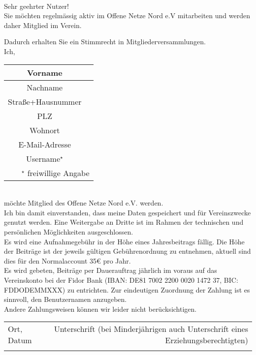 \documentclass[a4paper,8pt]{article}
\begin{document}
\ \\

Sehr geehrter Nutzer!\\

Sie möchten regelmässig aktiv im Offene Netze Nord e.V mitarbeiten und werden daher Mitglied im Verein.

Dadurch erhalten Sie ein Stimmrecht in Mitgliederversammlungen.\\

Ich,\\
\begin{tabular}{||c|p{10cm}||}
\hline
\hline
Vorname &\\
\hline
Nachname &\\
\hline
Straße+Hausnummer &\\
\hline
PLZ &\\
\hline
Wohnort &\\
\hline
E-Mail-Adresse &\\
\hline
Username$^\star$ &\\
\hline
\hline
\multicolumn{2}{r}{\tiny $^\star$ freiwillige Angabe}
\end{tabular}
\\
möchte Mitglied des Offene Netze Nord e.V. werden.\\

Ich bin damit einverstanden, dass meine Daten gespeichert und für Vereinszwecke genutzt werden.
Eine Weitergabe an Dritte ist im Rahmen der technischen und persönlichen Möglichkeiten ausgeschlossen.
\\

Es wird eine Aufnahmegebühr in der Höhe eines Jahresbeitrags fällig.
Die Höhe der Beiträge ist der jeweils gültigen Gebührenordnung zu entnehmen,
aktuell sind dies für den Normalaccount 35\euro{} pro Jahr.
\\

Es wird gebeten, Beiträge per Dauerauftrag jährlich im voraus auf das Vereinskonto bei der Fidor Bank (IBAN: DE81 7002 2200 0020 1472 37, BIC: FDDODEMMXXX) zu entrichten.
Zur eindeutigen Zuordnung der Zahlung ist es sinnvoll, den Benutzernamen anzugeben.
\\

Andere Zahlungsweisen können wir leider nicht berücksichtigen.
\\

\begin{tabular}{l r}
&\\
\hline
Ort, Datum & Unterschrift (bei Minderjährigen auch Unterschrift eines Erziehungsberechtigten)\\
&\\
\end{tabular}
\end{document}
